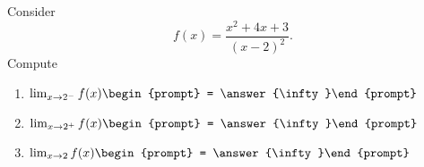 \documentclass{ximera}
\author{Bart Snapp}
\begin{document}
\begin{exercise}
Consider 
\[
f(x) = \frac{x^2+4 x+3}{(x-2)^2}.
\]
Compute
\begin{enumerate}
\item $\lim_{x\to 2^- } f(x) \begin{prompt} = \answer{\infty}\end{prompt}$
\item $\lim_{x\to 2^+ } f(x) \begin{prompt} = \answer{\infty}\end{prompt}$
\item $\lim_{x\to 2 } f(x) \begin{prompt} = \answer{\infty}\end{prompt}$
\end{enumerate}
\end{exercise}
\end{document}
